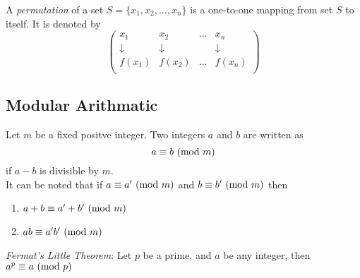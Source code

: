 \documentclass[../main.tex]{subfiles}
\begin{document}
A \emph{permutation} of a set $S = \{x_1,x_2,\ldots,x_n\}$ is a one-to-one mapping from set $S$ to itself. It is denoted by
\[
	\begin{pmatrix}
	x_1 & x_2 & \ldots & x_n\\
	\downarrow & \downarrow & & \downarrow\\
	f(x_1) & f(x_2) & \ldots & f(x_n)\\
	\end{pmatrix}
\] 

\subsection*{Modular Arithmatic}
Let $m$ be a fixed positve integer. Two integers $a$ and $b$ are written as
\[
	a\equiv b\ (\mathrm{mod}\ m) 
\]
if $a-b$ is divisible by $m$.\\
It can be noted that if $a\equiv a' \ (\mathrm{mod}\ m)$ and $b\equiv b' \ (\mathrm{mod}\ m)$ then
\begin{enumerate}[label=(\roman*)]
	\itemsep-1mm
	\item $a+b\equiv a' + b' \ (\mathrm{mod}\ m)$
	\item $ab\equiv a'b' \ (\mathrm{mod}\ m)$
\end{enumerate}
\textit{Fermat's Little Theorem}: Let $p$ be a prime, and $a$ be any integer, then $a^p\equiv a\ (\mathrm{mod}\ p)$
\end{document}
